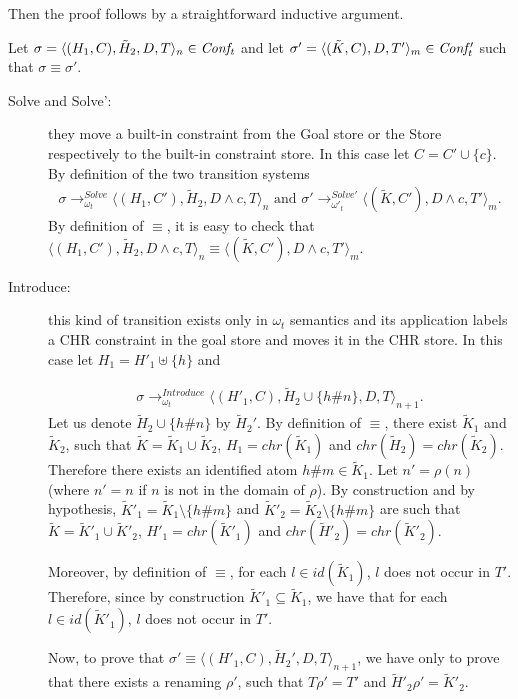 \documentclass[final]{acmtrans2e}
\newcommand{\la}{\langle}
\newcommand{\ra}{\rangle}
\newcommand{\rrarrow}{\longrightarrow}
\begin{document}
 Then the proof follows by a straightforward inductive argument.

Let $\sigma=\la(H_1,C),\tilde H_2, D, T\ra_n \in {\it Conf_t}$
and let  $\sigma'=\la(\tilde K,C), D, T'\ra_m \in {\it Conf'_t}$ such that
$\sigma\equiv\sigma'$.

\begin{description}
\item[Solve and Solve':] they move a built-in constraint from the Goal store or the Store
respectively to the built-in constraint store. In this case let $C=C' \cup \{c\}$. By definition of the two transition systems
\[\begin{array}{l}
\sigma \rrarrow_{\omega_t}^{Solve}
\la(H_1,C'),\tilde H_2, D \wedge c, T\ra_n \mbox{ and }
\sigma ' \rrarrow_{\omega'_t}^{Solve'}
\la(\tilde K,C'), D \wedge c, T'\ra_m.
\end{array}
\]
By definition of $\equiv$, it is easy to check that $\la(H_1,C'),\tilde H_2, D \wedge c, T\ra_n \equiv
\la(\tilde K,C'), D \wedge c, T'\ra_m$.


\item[Introduce:] this kind of transition exists only in $\omega_t$ semantics and its
application labels a CHR constraint in the goal store and moves it in the CHR store.
In this case let $H_1=H'_1\uplus \{h\}$ and

$$
\begin{array}{l}
\sigma\rrarrow_{\omega_t}^{Introduce}
\la (H'_1, C),  \tilde H_2 \cup \{h\#n\}, D, T\ra_{n+1}.
\end{array}
$$
Let us denote $ \tilde H_2 \cup \{h\#n\}$ by $ \tilde H_2'$.
By definition of $\equiv$,  there exist $\tilde K_1$ and $\tilde K_2$, such that $\tilde K =\tilde K_1\cup \tilde K_2$, $H_1 = chr(\tilde K_1)$ and $chr (\tilde H_2) = chr(\tilde K_2)$. Therefore
there exists an identified atom $h\#m \in \tilde K_1$.
Let $n'=\rho(n)$ (where $n'=n$ if $n$ is not in the domain of $\rho$).
By construction and by hypothesis, $\tilde K'_1= \tilde K_1 \setminus \{h\#m\}$ and $\tilde K'_2= \tilde K_2\setminus \{h\#m\}$ are such that $\tilde K =\tilde K'_1\cup \tilde K'_2$, $H'_1 = chr(\tilde K'_1)$ and $chr (\tilde H'_2) = chr(\tilde K'_2)$.

Moreover, by definition of $\equiv$, for each $l \in id (\tilde K_1)$, $l$ does not occur in $T'$. Therefore, since by construction $\tilde K'_1 \subseteq \tilde K_1$, we have that for each $l \in id (\tilde K'_1)$, $l$ does not occur in $T'$.

Now, to prove that $\sigma' \equiv
\la (H'_1, C),  \tilde H_2', D, T\ra_{n+1}$, we have only to prove that there exists a renaming $\rho'$, such that
$T\rho'=T'$ and $\tilde H'_2 \rho'= \tilde K'_2$.


\end{description}
\end{document}
